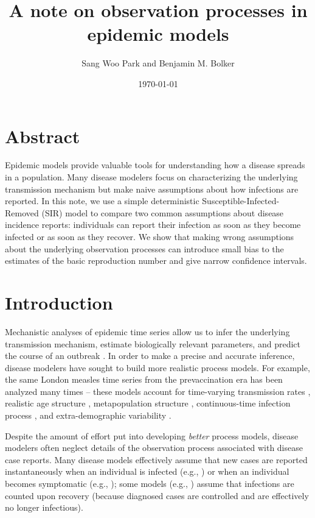 \documentclass[12pt]{article}\usepackage[]{graphicx}\usepackage[]{color}
\title{A note on observation processes in epidemic models}
\author{Sang Woo Park and Benjamin M. Bolker}
\date{\today}
\begin{document}
\maketitle

\section*{Abstract}

Epidemic models provide valuable tools for understanding how a disease
spreads in a population. Many disease modelers focus on characterizing
the underlying transmission mechanism but make naive assumptions about
how infections are reported. In this note, we use a simple deterministic
Susceptible-Infected-Removed (SIR) model to compare two common assumptions 
about disease incidence reports: individuals can report their infection as soon as
they become infected or as soon as they recover. We show that making
wrong assumptions about the underlying observation processes can introduce
small bias to the estimates of the basic reproduction number and give
narrow confidence intervals.

\section{Introduction}

Mechanistic analyses of epidemic time series allow us to infer the underlying 
transmission mechanism, estimate biologically relevant parameters, and 
predict the course of an outbreak \citep{breto2009time}. In order to make a 
precise and accurate inference, disease modelers have sought to build
more realistic process models. For example, the same London measles time 
series from the prevaccination era has been analyzed many times -- 
these models account for time-varying transmission rates \citep{fine1982measles}, 
realistic age structure \citep{schenzle1984age},
metapopulation structure \citep{xia2004measles}, continuous-time infection process 
\citep{cauchemez2008likelihood}, and extra-demographic variability \citep{he2009plug}. 

Despite the amount of effort put into developing \emph{better} process models, 
disease 
modelers often neglect details of the observation process associated with disease
case reports. Many disease models effectively assume that new cases are reported
instantaneously when an individual is infected (e.g., \cite{martinez2016differential, 
kennedy2018modeling, pons2018serotype}) or when an individual becomes symptomatic
(e.g., \cite{bhadra2011malaria, king2015avoidable}); 
some models (e.g., \cite{breto2009time, he2009plug, lin2016seasonality})
assume that infections are counted upon recovery (because diagnosed cases
are controlled and are effectively no longer infectious). 
\end{document}

